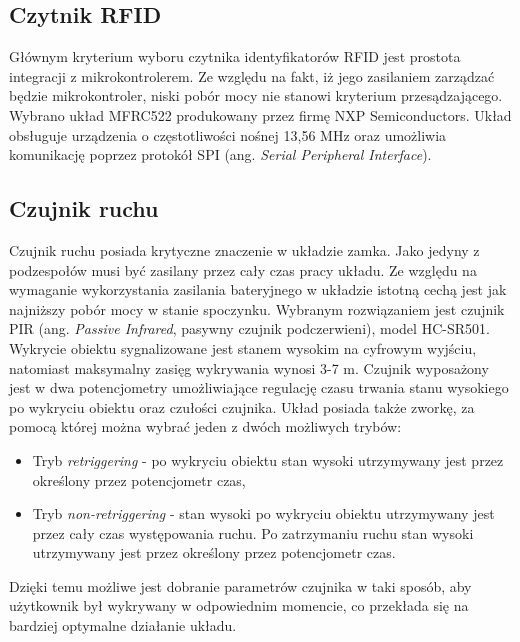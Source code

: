         \subsection{Czytnik RFID}

            Głównym kryterium wyboru czytnika identyfikatorów RFID jest prostota integracji z mikrokontrolerem. Ze względu na fakt, iż jego zasilaniem zarządzać będzie mikrokontroler, niski pobór mocy nie stanowi kryterium przesądzającego. Wybrano układ MFRC522 produkowany przez firmę NXP Semiconductors. Układ obsługuje urządzenia o częstotliwości nośnej 13,56 MHz oraz umożliwia komunikację poprzez protokół SPI (ang. \textit{Serial Peripheral Interface}).

        \subsection{Czujnik ruchu}

            Czujnik ruchu posiada krytyczne znaczenie w układzie zamka. Jako jedyny z podzespołów musi być zasilany przez cały czas pracy układu. Ze względu na wymaganie wykorzystania zasilania bateryjnego w układzie istotną cechą jest jak najniższy pobór mocy w stanie spoczynku. Wybranym rozwiązaniem jest czujnik PIR (ang. \textit{Passive Infrared}, pasywny czujnik podczerwieni), model HC-SR501. Wykrycie obiektu sygnalizowane jest stanem wysokim na cyfrowym wyjściu, natomiast maksymalny zasięg wykrywania wynosi 3-7 m. Czujnik wyposażony jest w dwa potencjometry umożliwiające regulację czasu trwania stanu wysokiego po wykryciu obiektu oraz czułości czujnika. Układ posiada także zworkę, za pomocą której można wybrać jeden z dwóch możliwych trybów:

            \begin{itemize}
                \item Tryb \textit{retriggering} - po wykryciu obiektu stan wysoki utrzymywany jest przez określony przez potencjometr czas,
                \item Tryb \textit{non-retriggering} - stan wysoki po wykryciu obiektu utrzymywany jest przez cały czas występowania ruchu. Po zatrzymaniu ruchu stan wysoki utrzymywany jest przez określony przez potencjometr czas.
            \end{itemize}

            Dzięki temu możliwe jest dobranie parametrów czujnika w taki sposób, aby użytkownik był wykrywany w odpowiednim momencie, co przekłada się na bardziej optymalne działanie układu.

